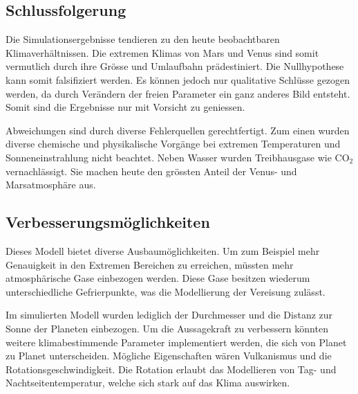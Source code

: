 \begin{refsection}
\section{Schlussfolgerung}

Die Simulationsergebnisse tendieren zu den heute beobachtbaren Klimaverhältnissen. Die extremen Klimas von Mars und Venus sind somit vermutlich durch ihre Grösse und Umlaufbahn prädestiniert. Die Nullhypothese kann somit falsifiziert werden. Es können jedoch nur qualitative Schlüsse gezogen werden, da durch Verändern der freien Parameter ein ganz anderes Bild entsteht. Somit sind die Ergebnisse nur mit Vorsicht zu geniessen.

Abweichungen sind durch diverse Fehlerquellen gerechtfertigt. Zum einen wurden diverse chemische und physikalische Vorgänge bei extremen Temperaturen und Sonneneinstrahlung nicht beachtet.
Neben Wasser wurden Treibhausgase wie CO$_2$ vernachlässigt. Sie machen heute den grössten Anteil der Venus- und Marsatmosphäre aus.

\subsection{Verbesserungsmöglichkeiten}

Dieses Modell bietet diverse Ausbaumöglichkeiten. Um zum Beispiel mehr Genauigkeit in den Extremen Bereichen zu erreichen, müssten mehr atmosphärische Gase einbezogen werden.
Diese Gase besitzen wiederum unterschiedliche Gefrierpunkte, was die Modellierung der Vereisung zulässt.
		
Im simulierten Modell wurden lediglich der Durchmesser und die Distanz zur Sonne der Planeten einbezogen. Um die Aussagekraft zu verbessern könnten weitere klimabestimmende Parameter implementiert werden, die sich von Planet zu Planet unterscheiden. Mögliche Eigenschaften wären Vulkanismus und die Rotationsgeschwindigkeit. Die Rotation erlaubt das Modellieren von Tag- und Nachtseitentemperatur, welche sich stark auf das Klima auswirken.

\printbibliography[heading=subbibliography]
\end{refsection}
